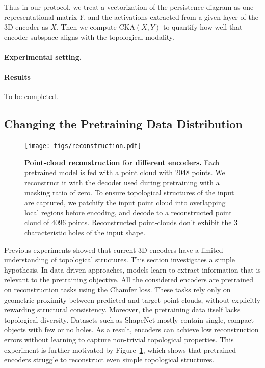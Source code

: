 Thus in our protocol, we treat a vectorization of the persistence diagram as one representational matrix $Y$, and the activations extracted from a given layer of the 3D encoder as $X$. Then we compute $\mathrm{CKA}(X,Y)$ to quantify how well that encoder subspace aligns with the topological modality.

\paragraph{Experimental setting.}



\paragraph{Results}
To be completed.

\subsection{Changing the Pretraining Data Distribution}
\label{ssec:changing_pretraining_data_distribution}

\begin{figure}[h]
  \centering
  
  \texttt{[image: figs/reconstruction.pdf]}
  \caption{\textbf{Point-cloud reconstruction for different encoders.} Each pretrained model is fed with a point cloud with 2048 points. We reconstruct it with the decoder used during pretraining with a masking ratio of zero. To ensure topological structures of the input are captured, we patchify the input point cloud into overlapping local regions before encoding, and decode to a reconstructed point cloud of 4096 points. Reconstructed point-clouds don't exhibit the 3 characteristic holes of the input shape.}
  \label{fig:reconstructions}
\end{figure}


Previous experiments showed that current 3D encoders have a limited understanding of topological structures. This section investigates a simple hypothesis. In data-driven approaches, models learn to extract information that is relevant to the pretraining objective. All the considered encoders are pretrained on reconstruction tasks using the Chamfer loss. These tasks rely only on geometric proximity between predicted and target point clouds, without explicitly rewarding structural consistency. Moreover, the pretraining data itself lacks topological diversity. Datasets such as ShapeNet mostly contain single, compact objects with few or no holes. As a result, encoders can achieve low reconstruction errors without learning to capture non-trivial topological properties. This experiment is further motivated by Figure~\ref{fig:reconstructions}, which shows that pretrained encoders struggle to reconstruct even simple topological structures.

